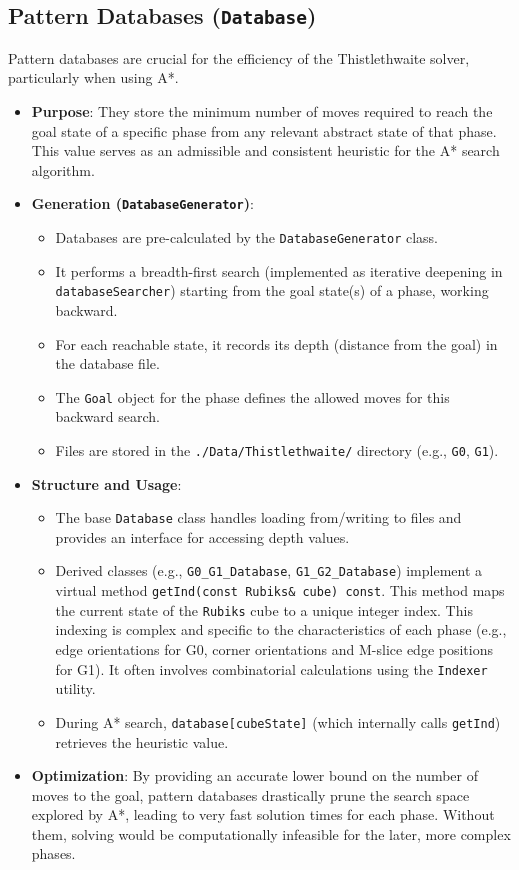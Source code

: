 \documentclass[11pt, a4paper]{article}
\begin{document}
\subsection{Pattern Databases (\texttt{Database})}
Pattern databases are crucial for the efficiency of the Thistlethwaite solver, particularly when using A*.
\begin{itemize}
    \item \textbf{Purpose}: They store the minimum number of moves required to reach the goal state of a specific phase from any relevant abstract state of that phase. This value serves as an admissible and consistent heuristic for the A* search algorithm.
    \item \textbf{Generation (\texttt{DatabaseGenerator})}:
        \begin{itemize}
            \item Databases are pre-calculated by the \texttt{DatabaseGenerator} class.
            \item It performs a breadth-first search (implemented as iterative deepening in \texttt{databaseSearcher}) starting from the goal state(s) of a phase, working backward.
            \item For each reachable state, it records its depth (distance from the goal) in the database file.
            \item The \texttt{Goal} object for the phase defines the allowed moves for this backward search.
            \item Files are stored in the \texttt{./Data/Thistlethwaite/} directory (e.g., \texttt{G0}, \texttt{G1}).
        \end{itemize}
    \item \textbf{Structure and Usage}:
        \begin{itemize}
            \item The base \texttt{Database} class handles loading from/writing to files and provides an interface for accessing depth values.
            \item Derived classes (e.g., \texttt{G0\_G1\_Database}, \texttt{G1\_G2\_Database}) implement a virtual method \texttt{getInd(const Rubiks\& cube) const}. This method maps the current state of the \texttt{Rubiks} cube to a unique integer index. This indexing is complex and specific to the characteristics of each phase (e.g., edge orientations for G0, corner orientations and M-slice edge positions for G1). It often involves combinatorial calculations using the \texttt{Indexer} utility.
            \item During A* search, \texttt{database[cubeState]} (which internally calls \texttt{getInd}) retrieves the heuristic value.
        \end{itemize}
    \item \textbf{Optimization}: By providing an accurate lower bound on the number of moves to the goal, pattern databases drastically prune the search space explored by A*, leading to very fast solution times for each phase. Without them, solving would be computationally infeasible for the later, more complex phases.
\end{itemize}
\end{document}
